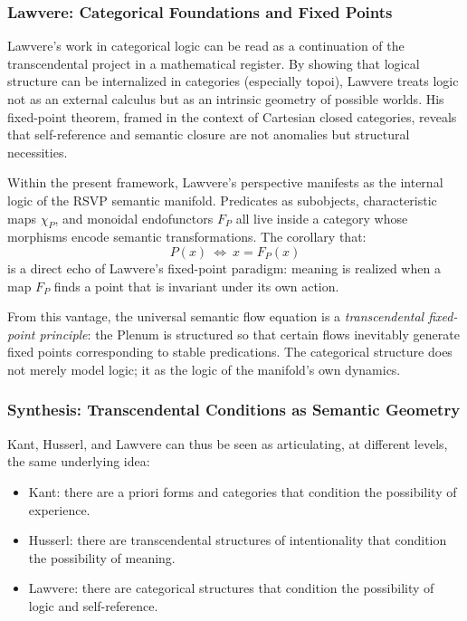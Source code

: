 \documentclass[12pt,letterpaper]{article}
\begin{document}
\subsubsection*{Lawvere: Categorical Foundations and Fixed Points}

Lawvere’s work in categorical logic can be read as a continuation of the
transcendental project in a mathematical register.  By showing that logical
structure can be internalized in categories (especially topoi), Lawvere treats
logic not as an external calculus but as an intrinsic geometry of possible
worlds.  His fixed-point theorem, framed in the context of Cartesian closed
categories, reveals that self-reference and semantic closure are not anomalies
but structural necessities.

Within the present framework, Lawvere’s perspective manifests as the internal
logic of the RSVP semantic manifold.  Predicates as subobjects, characteristic
maps $\chi_P$, and monoidal endofunctors $F_P$ all live inside a category whose
morphisms encode semantic transformations.  The corollary that:
\[
P(x)\ \Longleftrightarrow\ x = F_P(x)
\]
is a direct echo of Lawvere’s fixed-point paradigm: meaning is realized when a
map $F_P$ finds a point that is invariant under its own action.

From this vantage, the universal semantic flow equation is a
\emph{transcendental fixed-point principle}: the Plenum is structured so that
certain flows inevitably generate fixed points corresponding to stable
predications.  The categorical structure does not merely model logic; it
\emerges as the logic of the manifold’s own dynamics.

\subsubsection*{Synthesis: Transcendental Conditions as Semantic Geometry}

Kant, Husserl, and Lawvere can thus be seen as articulating, at different
levels, the same underlying idea:

\begin{itemize}
    \item Kant: there are a priori forms and categories that condition the
    possibility of experience.
    \item Husserl: there are transcendental structures of intentionality that
    condition the possibility of meaning.
    \item Lawvere: there are categorical structures that condition the possibility
    of logic and self-reference.
\end{itemize}
\end{document}
